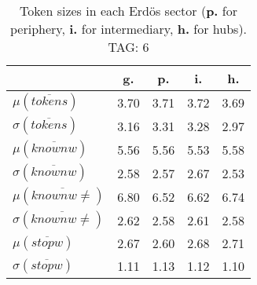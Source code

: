 \begin{table}[h!]
\begin{center}
\begin{tabular}{| l || c | c | c | c |}\hline
 & {\bf g.} & {\bf p.} & {\bf i.} & {\bf h.} \\\hline\hline
$\mu(\overline{tokens})$ & 3.70  & 3.71  & 3.72  & 3.69 \\
$\sigma(\overline{tokens})$ & 3.16  & 3.31  & 3.28  & 2.97 \\\hline
$\mu(\overline{knownw})$ & 5.56  & 5.56  & 5.53  & 5.58 \\
$\sigma(\overline{knownw})$ & 2.58  & 2.57  & 2.67  & 2.53 \\\hline
$\mu(\overline{knownw \neq})$ & 6.80  & 6.52  & 6.62  & 6.74 \\
$\sigma(\overline{knownw \neq})$ & 2.62  & 2.58  & 2.61  & 2.58 \\\hline
$\mu(\overline{stopw})$ & 2.67  & 2.60  & 2.68  & 2.71 \\
$\sigma(\overline{stopw})$ & 1.11  & 1.13  & 1.12  & 1.10 \\\hline
\end{tabular}
\caption{Token sizes in each Erd\"os sector ({{\bf p.}} for periphery, {{\bf i.}} for intermediary, {{\bf h.}} for hubs). TAG: 6}
\end{center}
\end{table}